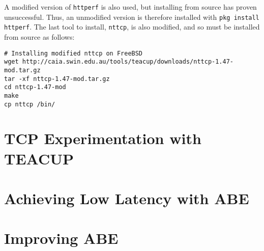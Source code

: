 
A modified version of \lstinline{httperf} is also used, but installing from source has proven unsuccessful. Thus, an unmodified version is therefore installed with \lstinline{pkg install httperf}. The last tool to install, \lstinline{nttcp}, is also modified, and so must be installed from source as follows:

\begin{verbatim}
# Installing modified nttcp on FreeBSD
wget http://caia.swin.edu.au/tools/teacup/downloads/nttcp-1.47-mod.tar.gz
tar -xf nttcp-1.47-mod.tar.gz
cd nttcp-1.47-mod
make
cp nttcp /bin/
\end{verbatim}


























\section{TCP Experimentation with TEACUP}




\section{Achieving Low Latency with ABE}



\section{Improving ABE}